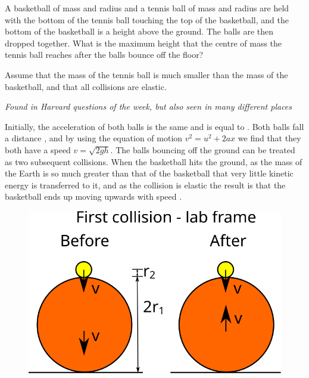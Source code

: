 
\begin{problem}[Superball] 
{A basketball of mass  and radius   and a tennis ball of  mass  and radius  are held with the bottom of the tennis ball touching the top of the basketball, and the bottom of the basketball is a height  above the ground. The balls are then dropped together. What is the maximum height that the centre of mass the tennis ball reaches after the balls bounce off the floor?

Assume that the mass of the tennis ball is much smaller than the mass of the basketball, and that all collisions are elastic.
}
{\textit{Found in Harvard questions of the week, but also seen in many different places}}
{Initially, the acceleration of both balls is the same and is equal to . Both balls fall a distance  , and by using the equation of motion $v^2 = u^2 + 2ax$ we find that they both have a speed $v = \sqrt{2gh}$. The balls bouncing off the ground can be treated as two subsequent collisions. When the basketball hits the ground, as the mass of the Earth is so much greater than that of the basketball that very little kinetic energy is transferred to it, and as the collision is elastic the result is that the basketball ends up moving upwards with speed .

\begin{figure}[h]
\centering
\includegraphics[width=1.0\textwidth]{../../../figures/dynamics_tennis_basket_ball_first.svg}
\caption{}\label{fig:dynamics_tennis_basket_first}
\end{figure}

}
\end{problem}
